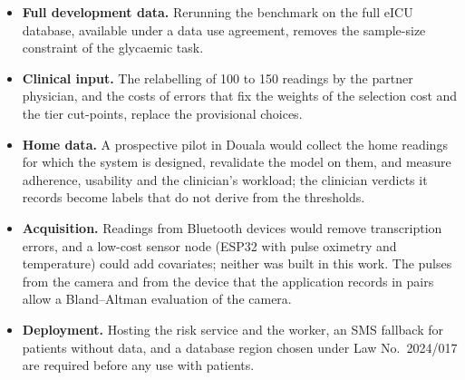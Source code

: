 \begin{itemize}
  \item \textbf{Full development data.} Rerunning the benchmark on the full eICU database, available under a data use agreement, removes the sample-size constraint of the glycaemic task.
  \item \textbf{Clinical input.} The relabelling of 100 to 150 readings by the partner physician, and the costs of errors that fix the weights of the selection cost and the tier cut-points, replace the provisional choices.
  \item \textbf{Home data.} A prospective pilot in Douala would collect the home readings for which the system is designed, revalidate the model on them, and measure adherence, usability and the clinician's workload; the clinician verdicts it records become labels that do not derive from the thresholds.
  \item \textbf{Acquisition.} Readings from Bluetooth devices would remove transcription errors, and a low-cost sensor node (ESP32 with pulse oximetry and temperature) could add covariates; neither was built in this work. The pulses from the camera and from the device that the application records in pairs allow a Bland--Altman evaluation of the camera.
  \item \textbf{Deployment.} Hosting the risk service and the worker, an SMS fallback for patients without data, and a database region chosen under Law No.~2024/017 are required before any use with patients.
\end{itemize}
